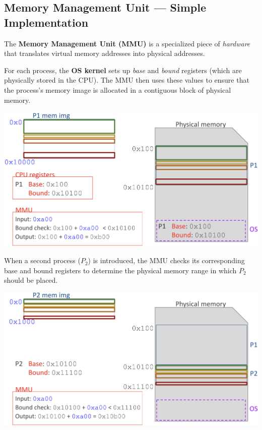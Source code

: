 \subsection{Memory Management Unit --- Simple Implementation}
\vspace{10px}
\noindent The \textbf{Memory Management Unit (MMU)} is a specialized piece of \textit{hardware} that translates virtual memory addresses into physical addresses.\\[10px]
\vspace{10px}
\noindent
\begin{minipage}{0.45\textwidth}
  For each process, the \textbf{OS kernel} sets up \emph{base} and \emph{bound} registers (which are physically stored in the CPU). The MMU then uses these values to ensure that the process’s memory image is allocated in a contiguous block of physical memory.\\[10px]
\begin{center}
  \includegraphics[width=1.1\textwidth]{chapters/L4/images/indirection.png}
\end{center}
\end{minipage}%
\hfill
\vline
\hfill
\begin{minipage}{0.45\textwidth}
\noindent When a second process (\(P_2\)) is introduced, the MMU checks its corresponding base and bound registers to determine the physical memory range in which \(P_2\) should be placed.
\begin{center}
  \includegraphics[width=1.1\textwidth]{chapters/L4/images/indirection-P2.png}
\end{center}
\end{minipage}
\\[70px]

